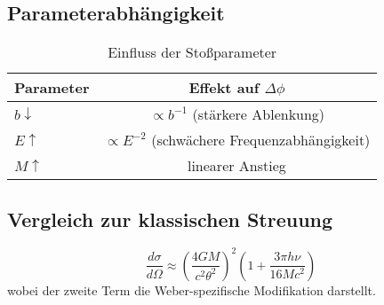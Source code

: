 \subsection{Parameterabhängigkeit}
\begin{table}[h]
\centering
\caption{Einfluss der Stoßparameter}
\begin{tabular}{lc}
\hline
Parameter & Effekt auf $\Delta\phi$ \\
\hline
$b \downarrow$ & $\propto b^{-1}$ (stärkere Ablenkung) \\
$E \uparrow$ & $\propto E^{-2}$ (schwächere Frequenzabhängigkeit) \\
$M \uparrow$ & linearer Anstieg \\
\hline
\end{tabular}
\end{table}

\subsection{Vergleich zur klassischen Streuung}
\begin{equation}
\frac{d\sigma}{d\Omega} \approx \left(\frac{4GM}{c^2\theta^2}\right)^2 \left(1 + \frac{3\pi h\nu}{16Mc^2}\right)
\end{equation}
wobei der zweite Term die Weber-spezifische Modifikation darstellt.
